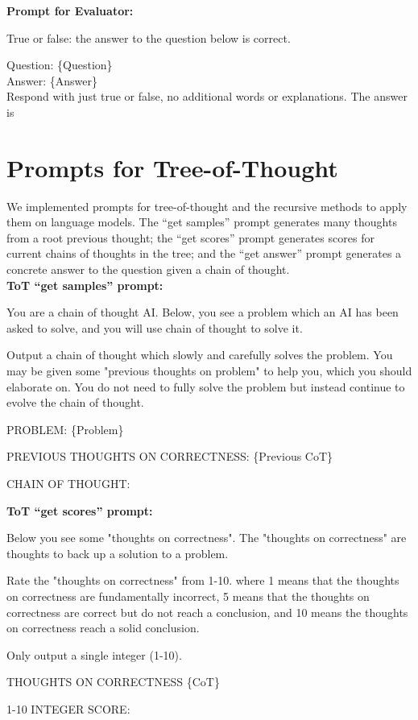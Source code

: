 \documentclass[11pt]{article}
\begin{document}
\textbf{Prompt for Evaluator:}
\begin{displayquote}
    True or false: the answer to the question below is correct.
    
    Question: \{Question\} \\
    Answer: \{Answer\} \\
    Respond with just true or false, no additional words or explanations. The answer is
\end{displayquote}


\newpage
\section{Prompts for Tree-of-Thought}
\label{appendix:tree-of-thought-prompts}

We implemented prompts for tree-of-thought and the recursive methods to apply them on language models. The ``get samples'' prompt generates many thoughts from a root previous thought; the ``get scores'' prompt generates scores for current chains of thoughts in the tree; and the ``get answer'' prompt generates a concrete answer to the question given a chain of thought. 
\\

\textbf{ToT ``get samples'' prompt:}
\begin{displayquote}
    You are a chain of thought AI. Below, you see a problem which an AI has been asked to solve, and you will use chain of thought to solve it. 

    Output a chain of thought which slowly and carefully solves the problem. You may be given some "previous thoughts on problem" to help you, which you should elaborate on. You do not need to fully solve the problem but instead continue to evolve the chain of thought. 

    PROBLEM:
    \{Problem\}

    PREVIOUS THOUGHTS ON CORRECTNESS:
    \{Previous CoT\}

    CHAIN OF THOUGHT:
\end{displayquote}



\textbf{ToT ``get scores'' prompt:}

\begin{displayquote}
    Below you see  some "thoughts on correctness". The "thoughts on correctness" are thoughts to back up a solution to a problem.

    Rate the "thoughts on correctness" from 1-10. where 1 means that the thoughts on correctness are fundamentally incorrect, 5 means that the thoughts on correctness are correct but do not reach a conclusion, and 10 means the thoughts on correctness reach a solid conclusion.

    Only output a single integer (1-10).

    THOUGHTS ON CORRECTNESS
    \{CoT\}

    1-10 INTEGER SCORE:
\end{displayquote}
\end{document}

